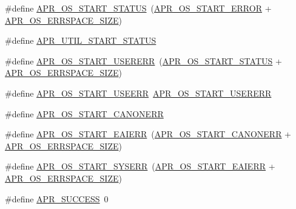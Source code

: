 \begin{DoxyCompactItemize}
\item 
\#define \hyperlink{group__apr__errno_ga450e1a5734732e092ddaa5b67414f69b}{A\-P\-R\-\_\-\-O\-S\-\_\-\-S\-T\-A\-R\-T\-\_\-\-S\-T\-A\-T\-U\-S}~(\hyperlink{group__apr__errno_ga191894048b7bd0cca3cf0bdff1eb695b}{A\-P\-R\-\_\-\-O\-S\-\_\-\-S\-T\-A\-R\-T\-\_\-\-E\-R\-R\-O\-R} + \hyperlink{group__apr__errno_gadb8d97e6836ccdc57b43b6119a5acccf}{A\-P\-R\-\_\-\-O\-S\-\_\-\-E\-R\-R\-S\-P\-A\-C\-E\-\_\-\-S\-I\-Z\-E})
\item 
\#define \hyperlink{group__apr__errno_gadf26297a72afa0ea224e7097fe59a1cd}{A\-P\-R\-\_\-\-U\-T\-I\-L\-\_\-\-S\-T\-A\-R\-T\-\_\-\-S\-T\-A\-T\-U\-S}
\item 
\#define \hyperlink{group__apr__errno_gacd35b2de1e38a1fa4717e38d5e153571}{A\-P\-R\-\_\-\-O\-S\-\_\-\-S\-T\-A\-R\-T\-\_\-\-U\-S\-E\-R\-E\-R\-R}~(\hyperlink{group__apr__errno_ga450e1a5734732e092ddaa5b67414f69b}{A\-P\-R\-\_\-\-O\-S\-\_\-\-S\-T\-A\-R\-T\-\_\-\-S\-T\-A\-T\-U\-S} + \hyperlink{group__apr__errno_gadb8d97e6836ccdc57b43b6119a5acccf}{A\-P\-R\-\_\-\-O\-S\-\_\-\-E\-R\-R\-S\-P\-A\-C\-E\-\_\-\-S\-I\-Z\-E})
\item 
\#define \hyperlink{group__apr__errno_ga803b8badf8695bdfa4fbcf4d330371f0}{A\-P\-R\-\_\-\-O\-S\-\_\-\-S\-T\-A\-R\-T\-\_\-\-U\-S\-E\-E\-R\-R}~\hyperlink{group__apr__errno_gacd35b2de1e38a1fa4717e38d5e153571}{A\-P\-R\-\_\-\-O\-S\-\_\-\-S\-T\-A\-R\-T\-\_\-\-U\-S\-E\-R\-E\-R\-R}
\item 
\#define \hyperlink{group__apr__errno_ga7bca957c11b80b31cb54b0d2cbe9e025}{A\-P\-R\-\_\-\-O\-S\-\_\-\-S\-T\-A\-R\-T\-\_\-\-C\-A\-N\-O\-N\-E\-R\-R}
\item 
\#define \hyperlink{group__apr__errno_ga2d04991cb57c67a896e22125a1f22b49}{A\-P\-R\-\_\-\-O\-S\-\_\-\-S\-T\-A\-R\-T\-\_\-\-E\-A\-I\-E\-R\-R}~(\hyperlink{group__apr__errno_ga7bca957c11b80b31cb54b0d2cbe9e025}{A\-P\-R\-\_\-\-O\-S\-\_\-\-S\-T\-A\-R\-T\-\_\-\-C\-A\-N\-O\-N\-E\-R\-R} + \hyperlink{group__apr__errno_gadb8d97e6836ccdc57b43b6119a5acccf}{A\-P\-R\-\_\-\-O\-S\-\_\-\-E\-R\-R\-S\-P\-A\-C\-E\-\_\-\-S\-I\-Z\-E})
\item 
\#define \hyperlink{group__apr__errno_gad70a5cad6862a9abcc254d35e827ac8b}{A\-P\-R\-\_\-\-O\-S\-\_\-\-S\-T\-A\-R\-T\-\_\-\-S\-Y\-S\-E\-R\-R}~(\hyperlink{group__apr__errno_ga2d04991cb57c67a896e22125a1f22b49}{A\-P\-R\-\_\-\-O\-S\-\_\-\-S\-T\-A\-R\-T\-\_\-\-E\-A\-I\-E\-R\-R} + \hyperlink{group__apr__errno_gadb8d97e6836ccdc57b43b6119a5acccf}{A\-P\-R\-\_\-\-O\-S\-\_\-\-E\-R\-R\-S\-P\-A\-C\-E\-\_\-\-S\-I\-Z\-E})
\item 
\#define \hyperlink{group__apr__errno_ga9ee311b7bf1c691dc521d721339ee2a6}{A\-P\-R\-\_\-\-S\-U\-C\-C\-E\-S\-S}~0
\end{DoxyCompactItemize}
